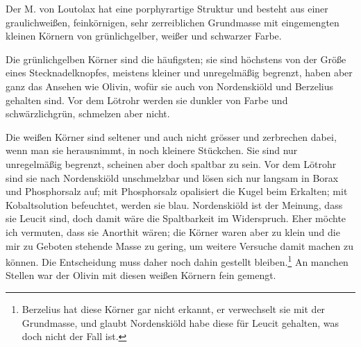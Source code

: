 \documentclass[a4paper, 11pt, oneside]{article}
\begin{document}
Der M. von Loutolax hat eine porphyrartige Struktur und besteht aus einer graulichweißen, feinkörnigen, sehr zerreiblichen Grundmasse mit eingemengten kleinen Körnern von grünlichgelber, weißer und schwarzer Farbe.

Die grünlichgelben Körner sind die häufigsten; sie sind höchstens von der Größe eines Stecknadelknopfes, meistens kleiner und unregelmäßig begrenzt, haben aber ganz das Ansehen wie Olivin, wofür sie auch von Nordenskiöld und Berzelius gehalten sind. Vor dem Lötrohr werden sie dunkler von Farbe und schwärzlichgrün, schmelzen aber nicht.

Die weißen Körner sind seltener und auch nicht grösser und zerbrechen dabei, wenn man sie herausnimmt, in noch kleinere Stückchen. Sie sind nur unregelmäßig begrenzt, scheinen aber doch spaltbar zu sein. Vor dem Lötrohr sind sie nach Nordenskiöld unschmelzbar und lösen sich nur langsam in Borax und Phosphorsalz auf; mit Phosphorsalz opalisiert die Kugel beim Erkalten; mit Kobaltsolution befeuchtet, werden sie blau. Nordenskiöld ist der Meinung, dass sie Leucit sind, doch damit wäre die Spaltbarkeit im Widerspruch. Eher möchte ich vermuten, dass sie Anorthit wären; die Körner waren aber zu klein und die mir zu Geboten stehende Masse zu gering, um weitere Versuche damit machen zu können. Die Entscheidung muss daher noch dahin gestellt bleiben.\footnote{Berzelius hat diese Körner gar nicht erkannt, er verwechselt sie mit der Grundmasse, und glaubt Nordenskiöld habe diese für Leucit gehalten, was doch nicht der Fall ist.} An manchen Stellen war der Olivin mit diesen weißen Körnern fein gemengt.
\end{document}
